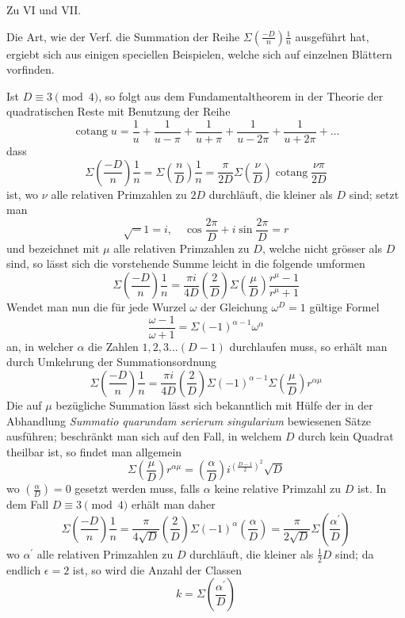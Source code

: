 \begin{center}\large Zu VI und VII.\end{center}

Die Art, wie der Verf. die Summation der Reihe $\Sigma\left(\frac{-D}n\right)\frac1n$ ausgeführt hat, ergiebt sich aus einigen speciellen Beispielen, welche sich auf einzelnen Blättern vorfinden.

Ist $D\equiv3\pmod4$, so folgt aus dem Fundamentaltheorem in der Theorie der quadratischen Reste mit Benutzung der Reihe
\[
\operatorname{cotang}u=\frac1u+\frac1{u-\pi}+\frac1{u+\pi}+\frac1{u-2\pi}+\frac1{u+2\pi}+\ldots
\]
dass
\[
\Sigma\left(\frac{-D}n\right)\frac1n=\Sigma\left(\frac nD\right)\frac1n=\frac\pi{2D}\Sigma\left(\frac\nu D\right)\operatorname{cotang}\frac{\nu\pi}{2D}
\]
ist, wo $\nu$ alle relativen Primzahlen zu $2D$ durchläuft, die kleiner als $D$ sind; setzt man
\[
\surd-1=i,\quad\cos\frac{2\pi}D+i\sin\frac{2\pi}D=r
\]
und bezeichnet mit $\mu$ alle relativen Primzahlen zu $D$, welche nicht grösser als $D$ sind, so lässt sich die vorstehende Summe leicht in die folgende umformen
\[
\Sigma\left(\frac{-D}n\right)\frac1n=\frac{\pi i}{4D}\left(\frac2D\right)\Sigma\left(\frac\mu D\right)\frac{r^\mu-1}{r^\mu+1}
\]
Wendet man nun die für jede Wurzel $\omega$ der Gleichung $\omega^D=1$ gültige Formel
%
\[
\frac{\omega-1}{\omega+1}=\Sigma(-1)^{\alpha-1}\omega^\alpha
\]
an, in welcher $\alpha$ die Zahlen $1,2,3\ldots(D-1)$ durchlaufen muss, so erhält man durch Umkehrung der Summationsordnung
\[
\Sigma\left(\frac{-D}n\right)\frac1n=\frac{\pi i}{4D}\left(\frac2D\right)\Sigma(-1)^{\alpha-1}\Sigma\left(\frac\mu D\right)r^{\alpha\mu}
\]
Die auf $\mu$ bezügliche Summation lässt sich bekanntlich mit Hülfe der in der Abhandlung \emph{Summatio quarundam serierum singularium} bewiesenen Sätze ausführen; beschränkt man sich auf den Fall, in welchem $D$ durch kein Quadrat theilbar ist, so findet man allgemein
\[
\Sigma\left(\frac\mu D\right)r^{\alpha\mu}=\left(\frac\alpha D\right)i^{\left(\frac{D-1}2\right)^2}\surd D
\]
wo $\left(\frac\alpha D\right)=0$ gesetzt werden muss, falls $\alpha$ keine relative Primzahl zu $D$ ist. In dem Fall $D\equiv3\pmod4$ erhält man daher
\[
\Sigma\left(\frac{-D}n\right)\frac1n=\frac\pi{4\surd D}\left(\frac2D\right)\Sigma(-1)^\alpha\left(\frac\alpha D\right)=\frac\pi{2\surd D}\Sigma\left(\frac{\alpha^{\prime}}D\right)
\]
wo $\alpha^{\prime}$ alle relativen Primzahlen zu $D$ durchläuft, die kleiner als $\frac12D$ sind; da endlich $\epsilon=2$ ist, so wird die Anzahl der Classen
\[
k=\Sigma\left(\frac{\alpha^{\prime}}D\right)
\]

